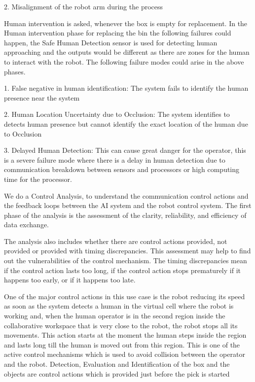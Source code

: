 {2. Misalignment of the robot arm during the process




Human intervention is asked, whenever the box is empty for replacement. In the Human intervention phase for replacing the bin the following failures could happen, the Safe Human Detection sensor is used for detecting human approaching and the outputs would be different as there are zones for the human to interact with the robot.
The following failure modes could arise in the above phases.

1. False negative in human identification: The system fails to identify the human presence near the system

2. Human Location Uncertainty due to Occlusion: The system identifies to detects human presence but cannot identify the exact location of the human due to Occlusion

3. Delayed Human Detection: This can cause great danger for the operator, this is a severe failure mode where there is a delay in human detection due to communication breakdown between sensors and processors or high computing time for the processor. 

\vspace{0.2cm}
\vspace{0.2cm}



We do a Control Analysis, to understand the communication control actions and the feedback loops between the AI system and the robot control system. The first phase of the analysis is the assessment of the clarity, reliability, and efficiency of data exchange.

The analysis also includes whether there are control actions provided, not provided or provided with timing discrepancies. This assessment may help to find out the vulnerabilities of the control mechanism. The timing discrepancies mean if the control action lasts too long, if the control action stops prematurely if it happens too early, or if it happens too late.

One of the major control actions in this use case is the robot reducing its speed as soon as the system detects a human in the virtual cell where the robot is working and, when the human operator is in the second region inside the collaborative workspace that is very close to the robot, the robot stops all its movements. This action starts at the moment the human steps inside the region and lasts long till the human is moved out from this region. This is one of the active control mechanisms which is used to avoid collision between the operator and the robot.
Detection, Evaluation and Identification of the box and the objects are control actions which is provided just before the pick is started 

}
